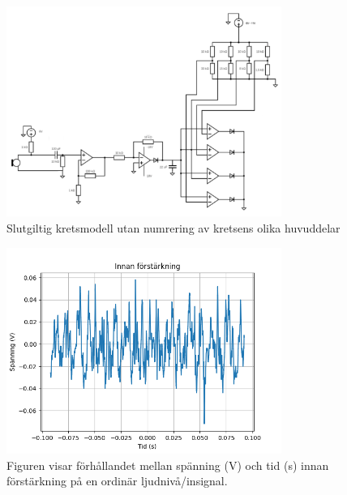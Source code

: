 \documentclass[12pt]{report}
\begin{document}
\begin{figure}[ht]
  \label{fig:circuitfix}
  \centering
  \includegraphics[width=0.8\textwidth]{bilder/circuit_fix.png}
  \caption{Slutgiltig kretsmodell utan numrering av kretsens olika huvuddelar}
\end{figure}

\begin{figure}[ht]
  \label{fig:innanf}
  \centering
  \includegraphics[width=0.8\textwidth]{bilder/innan.png}
  \caption{Figuren visar förhållandet mellan spänning (V) och tid (s) innan förstärkning på en ordinär ljudnivå/insignal.}
\end{figure}
\end{document}
